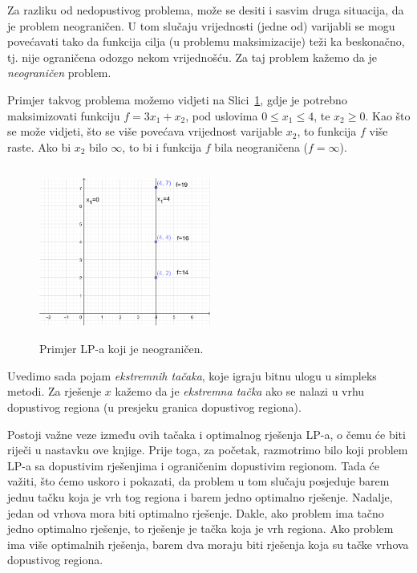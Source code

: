 \documentclass[a4paper, utf8, 11pt, colorlinks]{book}
\begin{document}
 Za razliku od nedopustivog problema, može se desiti i sasvim druga situacija, da je problem neograničen. U tom slučaju vrijednosti (jedne od) varijabli se mogu povećavati tako da funkcija cilja (u problemu maksimizacije) teži ka beskonačno, tj. nije ograničena odozgo nekom vrijednošću. Za taj problem kažemo da je \emph{neograničen} problem.
 
 Primjer takvog problema možemo vidjeti na Slici~\ref{fig:unbounded_solution}, gdje je potrebno maksimizovati funkciju $f = 3 x_1 + x_2$, pod uslovima $0\leq x_1 \leq 4$, te $x_2 \geq 0$. Kao što se može vidjeti, što se više povećava vrijednost varijable $x_2$, to funkcija $f$ više raste. Ako bi $x_2$ bilo $\infty$, to bi i funkcija $f$ bila neograničena ($f = \infty$).
 
  \begin{figure}
     \centering
     \includegraphics[width=160pt, height=160pt]{fig4.eps}
     \caption{Primjer LP-a koji je neograničen.}
     \label{fig:unbounded_solution}
 \end{figure}
 
Uvedimo sada pojam \emph{ekstremnih tačaka}, koje igraju bitnu ulogu u simpleks metodi. Za rješenje $x$ kažemo da je \emph{ekstremna tačka} ako se nalazi u vrhu dopustivog regiona (u presjeku granica dopustivog regiona).

Postoji važne veze između ovih tačaka i optimalnog rješenja LP-a, o čemu će biti riječi u nastavku ove knjige.
Prije toga, za početak, razmotrimo bilo koji problem LP-a sa dopustivim rješenjima i ograničenim dopustivim regionom. Tada će važiti, što ćemo uskoro i pokazati, da problem u tom slučaju posjeduje barem jednu tačku koja je vrh tog regiona i barem jedno optimalno rješenje. Nadalje, jedan od vrhova mora biti optimalno rješenje. Dakle, ako problem ima tačno jedno optimalno rješenje, to rješenje je tačka koja je vrh regiona. Ako problem ima više optimalnih rješenja, barem dva moraju biti rješenja koja su tačke  vrhova dopustivog regiona.
\end{document}

